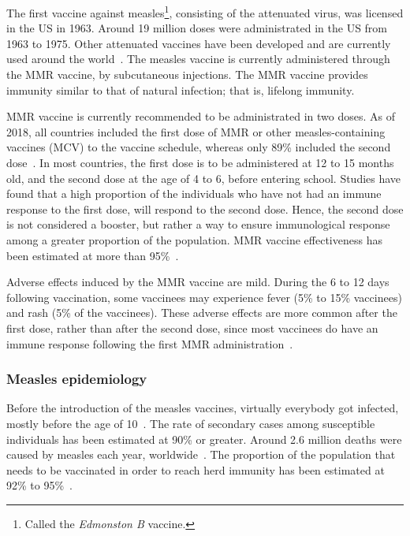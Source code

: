 The first vaccine against measles\footnote{Called the {\it Edmonston B} vaccine.}, consisting of the attenuated virus, was licensed in the US in 1963. Around 19 million doses were administrated in the US from 1963 to 1975. Other attenuated vaccines have been developed and are currently used around the world~\cite[]{Strebel2013}. The measles vaccine is currently administered through the MMR vaccine, by subcutaneous injections. The MMR vaccine provides immunity similar to that of natural infection; that is, lifelong immunity. 

MMR vaccine is currently recommended to be administrated in two doses. As of 2018, all countries included the first dose of MMR or other measles-containing vaccines (MCV) to the vaccine schedule, whereas only 89\% included the second dose~\cite[]{Peck2018}. In most countries, the first dose is to be administered at 12 to 15 months old, and the second dose at the age of 4 to 6, before entering school. Studies have found that a high proportion of the individuals who have not had an immune response to the first dose, will respond to the second dose. Hence, the second dose is not considered a booster, but rather a way to ensure immunological response among a greater proportion of the population. MMR vaccine effectiveness has been estimated at more than 95\%~\cite[]{Strebel2013}.

Adverse effects induced by the MMR vaccine are mild. During the 6 to 12 days following vaccination, some vaccinees may experience fever (5\% to 15\% vaccinees) and rash (5\% of the vaccinees). These adverse effects are more common after the first dose, rather than after the second dose, since most vaccinees do have an immune response following the first MMR administration~\cite[]{Strebel2013}.

\subsubsection*{Measles epidemiology}
\label{sec:MeaslesEpi}

Before the introduction of the measles vaccines, virtually everybody got infected, mostly before the age of 10~\cite[]{Strebel2013}. The rate of secondary cases among susceptible individuals has been estimated at 90\% or greater. Around 2.6 million deaths were caused by measles each year, worldwide~\cite[]{WHO_Factsheet_Measles}. The proportion of the population that needs to be vaccinated in order to reach herd immunity has been estimated at 92\% to 95\%~\cite[]{Strebel2013}. 

